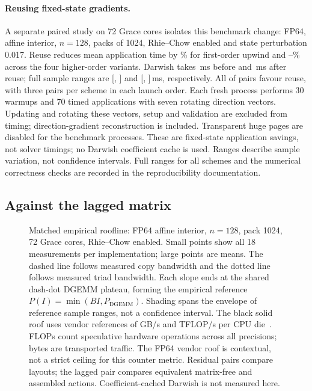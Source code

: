 \documentclass[sigconf,nonacm]{acmart}
\begin{document}
\paragraph{Reusing fixed-state gradients.}
A separate paired study on 72 Grace cores isolates this benchmark change:
FP64, affine interior, $n=128$, packs of 1024, Rhie--Chow enabled and
state perturbation 0.017. Reuse reduces mean application time by
\sgFirstSaved\% for first-order upwind and \sgHigherMin--\sgHigherMax\%
across the four higher-order variants. Darwish takes
\sgDarwishRebuildMean{}\,ms before and \sgDarwishReuseMean{}\,ms after reuse;
full sample ranges are [\sgDarwishRebuildMin, \sgDarwishRebuildMax] and
[\sgDarwishReuseMin, \sgDarwishReuseMax]\,ms, respectively.
All \sgPositive{} of \sgPairs{} pairs favour reuse, with three pairs per scheme
in each launch order. Each fresh process performs 30 warmups and 70 timed
applications with seven rotating direction vectors. Updating and rotating
these vectors, setup and validation are excluded from timing; direction-gradient
reconstruction is included. Transparent huge pages are disabled for the benchmark processes. These are fixed-state application
savings, not solver timings; no Darwish coefficient cache is used.
Ranges describe sample variation, not confidence intervals. Full ranges for
all schemes and the numerical correctness checks are recorded in the
reproducibility documentation.

\subsection{Against the lagged matrix}
\label{sec:res:spmv}

\begin{figure}[t]
  \centering
  
  \caption{Matched empirical roofline: FP64 affine interior, $n=128$, pack
    1024, 72 Grace cores, Rhie--Chow enabled. Small points show all 18
    measurements per implementation; large points are means. The dashed line
    follows measured copy bandwidth and the dotted line follows measured
    triad bandwidth. Each slope ends at the shared dash-dot DGEMM plateau,
    forming the empirical reference $P(I)=\min(BI,P_{\mathrm{DGEMM}})$.
    Shading spans the envelope of reference sample ranges, not a confidence interval. The black solid roof uses
    vendor references of \rlCompVendorBandwidth{} GB/s and
    \rlCompVendorPeak{} TFLOP/s per CPU die~\cite{NvidiaGrace2023}.
    FLOPs count speculative hardware operations across all precisions;
    bytes are transported traffic. The FP64 vendor roof is contextual, not
    a strict ceiling for this counter metric. Residual pairs compare layouts;
    the lagged pair compares equivalent matrix-free and assembled actions.
    Coefficient-cached Darwish is not measured here.}
  \label{fig:roofline}
\end{figure}
\end{document}
